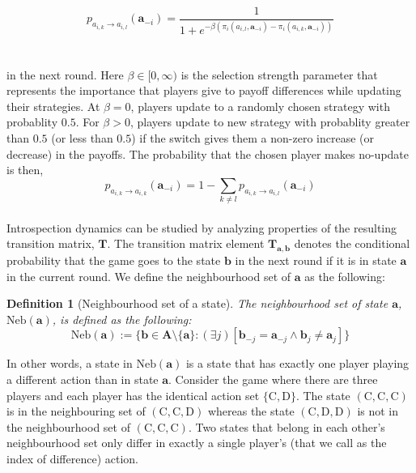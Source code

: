 \documentclass[11pt]{article}
\theoremstyle{plainCl1}
\newtheorem{definition}{Definition}
\theoremstyle{plainCl2}
\newcommand{\A}{\mathbf{A}}
\newcommand{\abf}{\mathbf{a}}
\newcommand{\bbf}{\mathbf{b}}
\newcommand{\T}{\mathbf{T}}
\newcommand{\C}{\mathrm{C}}
\newcommand{\D}{\mathrm{D}}
\begin{document}
\begin{equation}
 p_{a_{i,k} \to a_{i,l}} (\abf_{-i})= \frac{1}{1 + e^{\displaystyle -\beta(\pi_i(a_{i,l}, \abf_{-i}) - \pi_i(a_{i,k}, \abf_{-i}))}}
 \label{Eq:introspection-update}
\end{equation}
\\ \\ \noindent in the next round. Here $\beta \in [0,\infty)$ is the selection strength parameter that represents the importance that players give to payoff differences while updating their strategies. At $\beta = 0$, players update to a randomly chosen strategy with probablity $0.5$. For $\beta > 0$, players update to new strategy with probablity greater than $0.5$ (or less than $0.5$) if the switch gives them a non-zero increase (or decrease) in the payoffs. The probability that the chosen player makes no-update is then, \\
\begin{equation}
 p_{a_{i,k} \to a_{i,k}} (\abf_{-i}) = 1 - \sum_{k \neq l} p_{a_{i,k} \to a_{i,l}} (\abf_{-i})
 \label{Eq:introspection-normalization}
\end{equation}
\\ 
Introspection dynamics can be studied by analyzing properties of the resulting transition matrix, $\T$. The transition matrix element $\T_{\abf,\bbf}$ denotes the conditional probability that the game goes to the state $\bbf$ in the next round if it is in state $\abf$ in the current round. We define the neighbourhood set of $\abf$ as the following:
\newpage
\begin{definition}[Neighbourhood set of a state] The neighbourhood set of state $\abf$, $\mathrm{Neb}(\abf)$, is defined as the following:
\begin{equation}
\mathrm{Neb}(\abf) := \{\bbf \in \A \setminus \{ \abf \}  : (\exists j) [ \bbf_{-j} = \abf_{-j} \land  \bbf_{j} \neq \abf_{j}] \}
\label{Eq:neighbourhood-states}
\end{equation} 
\label{Def:neighbourhood-states}
\end{definition} 
\noindent In other words, a state in $\mathrm{Neb}(\abf)$ is a state that has exactly one player playing a different action than in state $\abf$. Consider the game where there are  three players and each player has the identical action set $\{\C, \D \}$.  The state $(\C,\C,\C)$ is in the neighbouring set of $(\C,\C,\D)$ whereas the state $(\C,\D,\D)$ is not in the neighbourhood set of $(\C,\C, \C)$. Two states that belong in each other's neighbourhood set only differ in exactly a single player's (that we call as the index of difference) action. 
\end{document}

